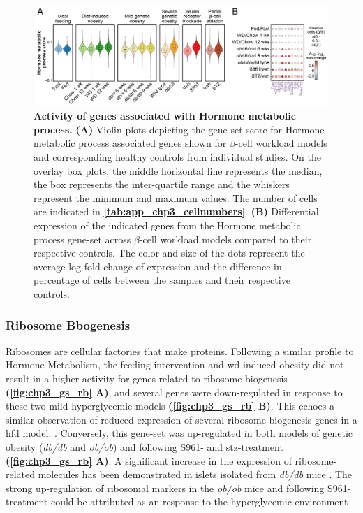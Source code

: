 \begin{figure}[t]
\centering
\includegraphics[width=\linewidth]{Chapter5/Fig/F3-13-02.png}
\caption[Activity of genes associated with hormone metabolic processes]{\textbf{Activity of genes associated with Hormone metabolic process.} \textbf{(A)} Violin plots depicting the gene-set score for Hormone metabolic process associated genes shown for $\beta$-cell workload models and corresponding healthy controls from individual studies. On the overlay box plots, the middle horizontal line represents the median, the box represents the inter-quartile range and the whiskers represent the minimum and maximum values. The number of cells are indicated in \textbf{\autoref{tab:app_chp3_cellnumbers}}. \textbf{(B)} Differential expression of the indicated genes from the Hormone metabolic process gene-set across $\beta$-cell workload models compared to their respective controls. The color and size of the dots represent the average log fold change of expression and the difference in percentage of cells between the samples and their respective controls.}
\label{fig:chp3_gs_hm}
\end{figure}


\subsubsection{Ribosome Bbogenesis}
Ribosomes are cellular factories that make proteins. Following a similar profile to Hormone Metabolism, the feeding intervention and \gls{wd}-induced obesity did not result in a higher activity for genes related to ribosome biogenesis \textbf{(\autoref{fig:chp3_gs_rb} A)}, and several genes were down-regulated in response to these two mild hyperglycemic models \textbf{(\autoref{fig:chp3_gs_rb} B)}. This echoes a similar observation of reduced expression of several ribosome biogenesis genes in a \gls{hfd} model. \textbf{\cite{hatanaka_chronic_2017}}. Conversely, this gene-set was up-regulated in both models of genetic obesity (\textit{db/db} and \textit{ob/ob}) and following S961- and \gls{stz}-treatment \textbf{(\autoref{fig:chp3_gs_rb} A)}. A significant increase in the expression of ribosome-related molecules has been demonstrated in islets isolated from \textit{db/db} mice \textbf{\cite{asahara_increased_2009}}. The strong up-regulation of ribosomal markers in the \textit{ob/ob} mice and following  S961-treatment could be attributed as an response to the hyperglycemic environment

